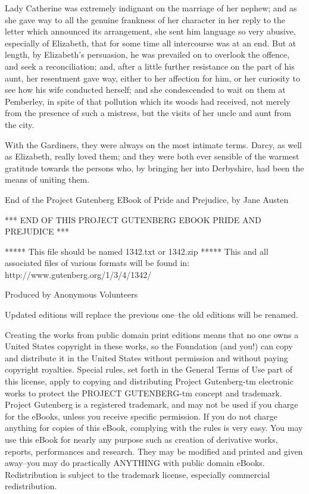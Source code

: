 \documentclass[twocolumn]{article}
\begin{document}
Lady Catherine was extremely indignant on the marriage of her nephew;
and as she gave way to all the genuine frankness of her character in
her reply to the letter which announced its arrangement, she sent him
language so very abusive, especially of Elizabeth, that for some time
all intercourse was at an end. But at length, by Elizabeth's persuasion,
he was prevailed on to overlook the offence, and seek a reconciliation;
and, after a little further resistance on the part of his aunt, her
resentment gave way, either to her affection for him, or her curiosity
to see how his wife conducted herself; and she condescended to wait
on them at Pemberley, in spite of that pollution which its woods had
received, not merely from the presence of such a mistress, but the
visits of her uncle and aunt from the city.

With the Gardiners, they were always on the most intimate terms.
Darcy, as well as Elizabeth, really loved them; and they were both ever
sensible of the warmest gratitude towards the persons who, by bringing
her into Derbyshire, had been the means of uniting them.





End of the Project Gutenberg EBook of Pride and Prejudice, by Jane Austen

*** END OF THIS PROJECT GUTENBERG EBOOK PRIDE AND PREJUDICE ***

***** This file should be named 1342.txt or 1342.zip *****
This and all associated files of various formats will be found in:
        http://www.gutenberg.org/1/3/4/1342/

Produced by Anonymous Volunteers

Updated editions will replace the previous one--the old editions
will be renamed.

Creating the works from public domain print editions means that no
one owns a United States copyright in these works, so the Foundation
(and you!) can copy and distribute it in the United States without
permission and without paying copyright royalties.  Special rules,
set forth in the General Terms of Use part of this license, apply to
copying and distributing Project Gutenberg-tm electronic works to
protect the PROJECT GUTENBERG-tm concept and trademark.  Project
Gutenberg is a registered trademark, and may not be used if you
charge for the eBooks, unless you receive specific permission.  If you
do not charge anything for copies of this eBook, complying with the
rules is very easy.  You may use this eBook for nearly any purpose
such as creation of derivative works, reports, performances and
research.  They may be modified and printed and given away--you may do
practically ANYTHING with public domain eBooks.  Redistribution is
subject to the trademark license, especially commercial
redistribution.
\end{document}
